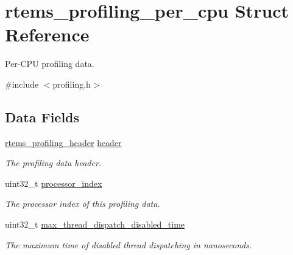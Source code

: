 \hypertarget{structrtems__profiling__per__cpu}{}\section{rtems\+\_\+profiling\+\_\+per\+\_\+cpu Struct Reference}
\label{structrtems__profiling__per__cpu}


Per-\/\+C\+PU profiling data.  




{\ttfamily \#include $<$profiling.\+h$>$}

\subsection*{Data Fields}
\begin{DoxyCompactItemize}
\item 
\mbox{\label{structrtems__profiling__per__cpu_a6e745ab55496d189e283cf68b1e3351d}} 
\mbox{\hyperlink{structrtems__profiling__header}{rtems\+\_\+profiling\+\_\+header}} \mbox{\hyperlink{structrtems__profiling__per__cpu_a6e745ab55496d189e283cf68b1e3351d}{header}}
\begin{DoxyCompactList}\small\item\em The profiling data header. \end{DoxyCompactList}\item 
\mbox{\label{structrtems__profiling__per__cpu_ab06a40d92710b95257fd389a09ab936e}} 
uint32\+\_\+t \mbox{\hyperlink{structrtems__profiling__per__cpu_ab06a40d92710b95257fd389a09ab936e}{processor\+\_\+index}}
\begin{DoxyCompactList}\small\item\em The processor index of this profiling data. \end{DoxyCompactList}\item 
\mbox{\label{structrtems__profiling__per__cpu_a652f95fcdca93b2993b696babf2b8472}} 
uint32\+\_\+t \mbox{\hyperlink{structrtems__profiling__per__cpu_a652f95fcdca93b2993b696babf2b8472}{max\+\_\+thread\+\_\+dispatch\+\_\+disabled\+\_\+time}}
\begin{DoxyCompactList}\small\item\em The maximum time of disabled thread dispatching in nanoseconds. \end{DoxyCompactList}\item 

\end{DoxyCompactItemize}
